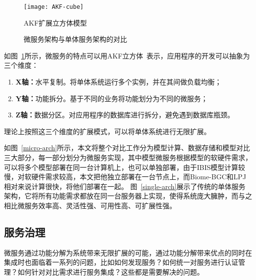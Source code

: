 \begin{figure}[!htbp]
    \centering
    \texttt{[image: AKF-cube]}
    \caption{AKF扩展立方体模型}
    \label{fig:AKF-cube}
\end{figure}

\begin{figure}[!htbp]
    \centering

    \hfill

    \caption{微服务架构与单体服务架构的对比}
    \label{fig:ms-server-microservice}
\end{figure}

如图~\ref{fig:AKF-cube}所示，微服务的特点可以用AKF立方体~\cite{abbott2009art}表示，应用程序的开发可以抽象为三个维度：

\begin{enumerate}[(1)]
    \item \textbf{X轴：}水平复制。将单体系统运行多个实例，并在其间做负载均衡；
    \item \textbf{Y轴：}功能拆分。基于不同的业务将功能划分为不同的微服务；
    \item \textbf{Z轴：}数据分区。对应用程序的数据库进行拆分，避免遇到数据库瓶颈。
\end{enumerate}

理论上按照这三个维度的扩展模式，可以将单体系统进行无限扩展。

如图~\ref{micro-arch}所示，本文将整个对比工作分为模型计算、数据存储和模型对比三大部分，每一部分划分为微服务实现，其中模型微服务根据模型的软硬件需求，可以将多个模型部署在同一台计算机上，也可以单独部署，由于IBIS模型计算较慢，对软硬件需求较高，本文把他独立部署在一台节点上，而Biome-BGC和LPJ相对来说计算很快，将他们部署在一起。
图~\ref{single-arch}展示了传统的单体服务架构，它将所有功能需求都放在同一台服务器上实现，使得系统庞大臃肿，而与之相比微服务效率高、灵活性强、可用性高、可扩展性强。

\subsection{服务治理}
微服务通过功能分解为系统带来无限扩展的可能，通过功能分解带来优点的同时在集成时也面临着一系列的问题，比如如何发现服务？如何统一对服务进行认证管理？如何针对对比需求进行服务集成？这些都是需要解决的问题。
